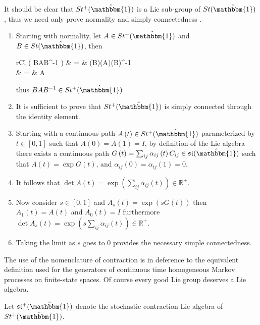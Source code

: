 \begin{IEEEproof}
	It should be clear that $St^{+}(\hat{\mathbbm{1}})$ is a Lie sub-group of $St(\hat{\mathbbm{1}})$,
	thus we need only prove normality and simply connectedness \cite{sternberg_lie_2009}.
	\begin{enumerate}
		\item Starting with normality, let $A \in St^{+}(\hat{\mathbbm{1}})$ and $B \in St(\hat{\mathbbm{1}})$,
		then
		\begin{IEEEeqnarray*}{rCl}
			\det \left( BAB^{-1} \right)
				& = & \left(\det B\right)\left(\det A\right)\left(\det B\right)^{-1}\\
				& = & \det A
		\end{IEEEeqnarray*}
		thus $BAB^{-1} \in St^{+}(\hat{\mathbbm{1}})$
		\item It is sufficient to prove that $St^{+}(\hat{\mathbbm{1}})$ is simply connected
		through the identity element.
		\item Starting with a continuous path $A\left(t\right) \in St^{+}(\hat{\mathbbm{1}})$
		parameterized by $t \in \left[0,1\right]$ such that $A\left(0\right) = A\left(1\right) = I$,
		by definition of the Lie algebra there exists a continuous path $G\left(t \right) = \sum_{ij} \alpha_{ij}\left(t\right) C_{ij} \in \mathfrak{st}(\hat{\mathbbm{1}})$ 
		such that $A\left(t\right) = \exp G\left(t\right)$, and $\alpha_{ij}\left(0\right) = \alpha_{ij}\left(1\right) = 0$.
		\item It follows that $\det A\left(t\right) = \exp\left(\sum_{ij} \alpha_{ij}\left(t\right)\right) \in \mathbb{R}^{+}$.
		\item Now consider $s \in \left[0,1\right]$ and $A_s\left(t\right) = \exp\left(sG\left(t\right)\right)$
		then $A_1\left(t\right) = A\left(t\right)$ and $A_0\left(t\right) = I$
		furthermore $\det A_s\left(t\right) = \exp\left(s \sum_{ij} \alpha_{ij}\left(t\right)\right) \in \mathbb{R}^{+}$.
		\item Taking the limit as $s$ goes to $0$ provides the necessary simple 
		connectedness.\hfill\IEEEQEDhere
	\end{enumerate}
\end{IEEEproof}
The use of the nomenclature of contraction is in deference to the equivalent definition used
for the generators of continuous time homogeneous Markov processes on finite-state spaces.
Of course every good Lie group deserves a Lie algebra.
\begin{definition}
	Let $\mathfrak{st}^{+}(\hat{\mathbbm{1}})$ denote the stochastic contraction Lie 
	algebra of $St^{+}(\hat{\mathbbm{1}})$.
\end{definition}
